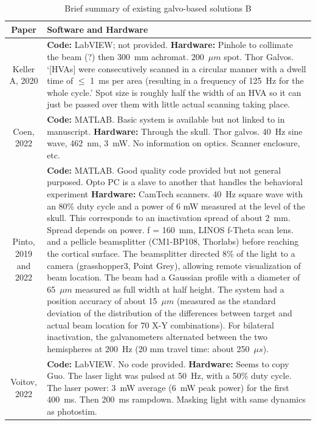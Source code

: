 \begin{table}[h]
    \centering
    \begin{tabular}{c|p{100mm}}
        Paper & Software and Hardware  \\
    \hline
    
    Keller A, 2020 & \textbf{Code:} LabVIEW; not provided. \textbf{Hardware:} Pinhole to collimate the beam (?) then 300~mm achromat. 200~$\mu m$ spot. Thor Galvos. `[HVAs] were consecutively scanned in a circular manner with a dwell time of $\leq$ 1~ms per area (resulting in a frequency of 125~Hz for the whole cycle.' Spot size is roughly half the width of an HVA so it can just be passed over them with little actual scanning taking place.\\ 

    Coen, 2022 & \textbf{Code:} MATLAB. Basic system is available but not linked to in manuscript. \textbf{Hardware:} Through the skull. Thor galvos. 40~Hz sine wave, 462~nm, 3~mW. No information on optics. Scanner enclosure, etc.\\ 
        
    Pinto, 2019 and 2022 & \textbf{Code:} MATLAB. Good quality code provided but not general purposed. Opto PC is a slave to another that handles the behavioral experiment \textbf{Hardware:}  CamTech scanners. 40~Hz square wave with an 80\% duty cycle and a power of 6 mW measured at the level of the skull.  This corresponds to an inactivation spread of about 2~mm. Spread depends on power. f = 160~mm, LINOS f-Theta scan lens. and a pellicle beamsplitter (CM1-BP108, Thorlabs) before reaching the cortical surface. The beamsplitter directed 8\% of the light to a camera (grasshopper3, Point Grey), allowing remote visualization of beam location.     The beam had a Gaussian profile with a diameter of 65~$\mu m$ measured as full width at half height. The system had a position accuracy of about 15~$\mu m$ (measured as the standard deviation of the distribution of the differences between target and actual beam location for 70 X-Y combinations). For bilateral inactivation, the galvanometers alternated between the two hemispheres at 200~Hz (20 mm travel time: about 250~$\mu s$).  \\ 
    
    Voitov, 2022 & \textbf{Code:} LabVIEW. No code provided. \textbf{Hardware:} Seems to copy Guo. The laser light was pulsed at 50~Hz, with a 50\% duty cycle. The laser power: 3~mW average (6~mW peak power) for the first 400~ms. Then 200~ms rampdown. Masking light with same dynamics as photostim. \\ 

    \hline
    \end{tabular}
    \caption{Brief summary of existing galvo-based solutions B}
    \label{tab:system_summary B}
\end{table}